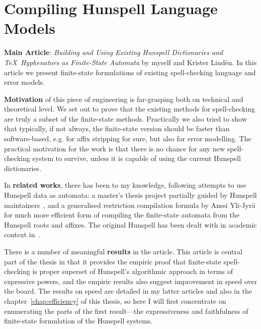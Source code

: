 \documentclass[officiallayout,draft]{unihelcompling}
\begin{document}
\section{Compiling Hunspell Language Models}
\label{sec:Hunspell}

\textbf{Main Article}: \emph{Building and Using Existing Hunspell Dictionaries
and \TeX\ Hyphenators as Finite-State Automata} by myself and Krister Lindén.
In this article we present finite-state formulations of existing spell-checking
language and error models.

\textbf{Motivation} of this piece of engineering is far-grasping both on 
technical and theoretical level. We set out to prove that the existing
methods for spell-checking are truly a subset of the finite-state methods.
Practically we also tried to show that typically, if not always, the 
finite-state version should be faster than software-based, e.g. for affix
stripping for sure, but also for error modelling. The practical motivation
for the work is that there is no chance for any new spell-checking system to
survive, unless it is capable of using the current Hunspell dictionaries.

In \textbf{related works}, there has been to my knowledge, following
attempts to use Hunspell data as automata: a master's thesis project partially
guided by Hunspell maintainers~\citep{greenfield2010open}, and a generalised
restriction compilation formula by Anssi Yli-Jyrä for much more efficient form
of compiling the finite-state automata from the Hunspell roots and affixes. The
original Hunspell has been dealt with in academic context 
in~\citet{tron2005hunmorph}.

There is a number of meaningful \textbf{results} in the article. This article
is central part of the thesis in that it provides the empiric proof that
finite-state spell-checking is proper superset of Hunspell's algorithmic 
approach in terms of expressive powers, and the empiric results also suggest
improvement in speed over the board. The results on speed are detailed in my
latter articles and also in the chapter~\ref{chap:efficiency} of this thesis,
so here I will first concentrate on enumerating the parts of the first
result---the expressiveness and faithfulness of finite-state formulation of
the Hunspell systems.
\end{document}
